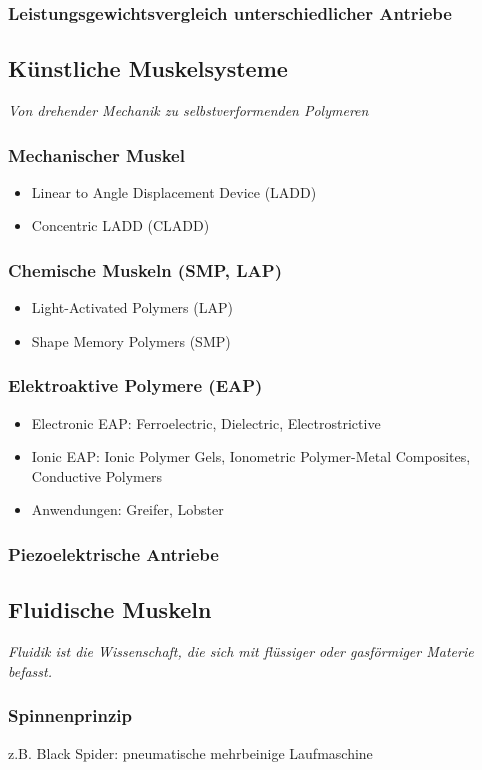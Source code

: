 \subsubsection{Leistungsgewichtsvergleich unterschiedlicher Antriebe}
\subsection{Künstliche Muskelsysteme}
\emph{Von drehender Mechanik zu selbstverformenden Polymeren}
\subsubsection{Mechanischer Muskel}
\begin{itemize}
	\item Linear to Angle Displacement Device (LADD)
	\item Concentric LADD (CLADD)
\end{itemize}
\subsubsection{Chemische Muskeln (SMP, LAP)}
\begin{itemize}
	\item Light-Activated Polymers (LAP)
	\item Shape Memory Polymers (SMP)
\end{itemize}
\subsubsection{Elektroaktive Polymere (EAP)}
\begin{itemize}
	\item Electronic EAP: Ferroelectric, Dielectric, Electrostrictive
	\item Ionic EAP: Ionic Polymer Gels, Ionometric Polymer-Metal Composites, Conductive Polymers
	\item Anwendungen: Greifer, Lobster
\end{itemize}
\subsubsection{Piezoelektrische Antriebe}
\subsection{Fluidische Muskeln}
\emph{Fluidik ist die Wissenschaft, die sich mit
flüssiger oder gasförmiger Materie befasst.}
\subsubsection{Spinnenprinzip}
z.B. \glqq Black Spider\grqq : pneumatische mehrbeinige Laufmaschine
